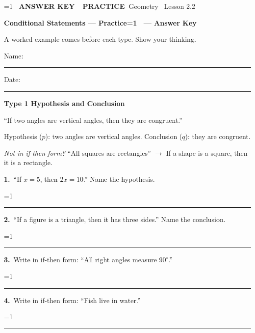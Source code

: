 \documentclass[11pt,letterpaper]{article}
\newcommand{\badge}[1]{\colorbox{fmtitle}{\color{white}\bfseries\small\ #1\ }}
\newcommand{\topicbar}[1]{\needspace{4.5cm}\par\vspace{5mm}
  \begin{tcolorbox}[enhanced,colback=fmtitle,colframe=fmtitle,arc=2mm,left=4mm,top=1.5mm,bottom=1.5mm]
  \color{white}\bfseries\large #1
  \end{tcolorbox}}
\providecommand{\iskey}{0}
\newcommand{\pans}[2][3.2cm]{\ifnum\iskey=1 \underline{\makebox[#1][c]{\color{fmmistake}\bfseries #2}}\else\rule{#1}{0.4pt}\fi}
\newcommand{\sdp}[3]{\begin{minipage}[t][2.4cm]{0.48\linewidth}{\color{fmturn}\bfseries #1.}\ #2\par\vfill\hfill \pans[3.6cm]{#3}\end{minipage}}
\newcommand{\algp}[3]{\begin{minipage}[t][4.6cm]{0.48\linewidth}{\color{fmturn}\bfseries #1.}\ #2\par\vfill\hfill \pans[4.2cm]{#3}\end{minipage}}
\newlength{\pw}
\renewcommand{\pans}[2][3.2cm]{\ifnum\iskey=1 \settowidth{\pw}{\bfseries #2}\ifdim\pw>#1 \parbox[b]{#1}{\raggedleft\color{fmmistake}\bfseries\small #2}\else\underline{\makebox[#1][c]{\color{fmmistake}\bfseries #2}}\fi\else\rule{#1}{0.4pt}\fi}
\begin{document}
\ifnum\iskey=1 \colorbox{fmwatch}{\color{white}\bfseries\small\ ANSWER KEY\ }\else\badge{PRACTICE}\fi\hfill{\small\color{fmgray}Geometry \textperiodcentered\ Lesson 2.2}\par\vspace{4mm}
{\color{fmtitle}\LARGE\bfseries Conditional Statements --- Practice\ifnum\iskey=1 \ --- Answer Key\fi}\par\vspace{1mm}
{\color{fmgray}A worked example comes before each type. Show your thinking.}\par\vspace{3mm}
Name: \rule{6cm}{0.4pt}\hspace{1cm}Date: \rule{3.5cm}{0.4pt}\par\vspace{2mm}

\needspace{6cm}\topicbar{Type 1 \quad Hypothesis and Conclusion}
\begin{watchme}``If two angles are vertical angles, then they are congruent.''\par
Hypothesis ($p$): two angles are vertical angles. \quad Conclusion ($q$): they are congruent.\par
\emph{Not in if-then form?} ``All squares are rectangles'' $\to$ If a shape is a square, then it is a rectangle.\end{watchme}
\needspace{3.4cm}\noindent\sdp{1}{``If $x = 5$, then $2x = 10$.'' Name the hypothesis.}{$x = 5$}\hfill\sdp{2}{``If a figure is a triangle, then it has three sides.'' Name the conclusion.}{it has three sides}\par\vspace{2mm}
\needspace{4.6cm}\noindent\algp{3}{Write in if-then form: ``All right angles measure $90^\circ$.''}{If an angle is right, then it measures $90^\circ$.}\hfill\algp{4}{Write in if-then form: ``Fish live in water.''}{If an animal is a fish, then it lives in water.}\par
\end{document}
